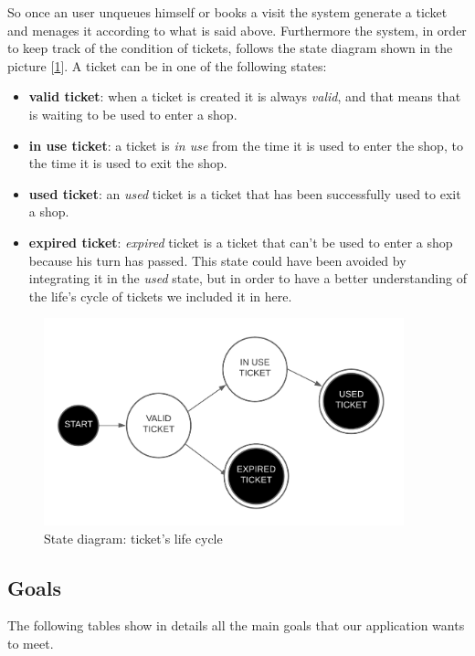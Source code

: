 So once an user unqueues himself or books a visit the system generate a ticket and menages it according to what is said above. Furthermore the system, in order to keep track of the condition of tickets, follows the state diagram shown in the picture [\ref{fig:ticketlifecycle}]. A ticket can be in one of the following states:
\begin{itemize}[topsep=0pt]
    \item \textbf{valid ticket}: when a ticket is created it is always \textit{valid}, and that means that is waiting to be used to enter a shop.
    \item \textbf{in use ticket}: a ticket is \textit{in use} from the time it is used to enter the shop, to the time it is used to exit the shop.
    \item \textbf{used ticket}: an \textit{used} ticket is a ticket that has been successfully used to exit a shop. 
    \item \textbf{expired ticket}: \textit{expired} ticket is a ticket that can't be used to enter a shop because his turn has passed. This state could have been avoided by integrating it in the \textit{used} state, but in order to have a better understanding of the life's cycle of tickets we included it in here. 
\end{itemize}

\begin{figure}[h!]
    \centering
    \includegraphics[height=6cm]{Images/statediagrams/ticketlifecycle.png}
    \caption{\label{fig:ticketlifecycle}State diagram: ticket's life cycle}
\end{figure}

\FloatBarrier

\subsection{Goals}
\label{subsect:goals}

The following tables show in details all the main goals that our application wants to meet. 


